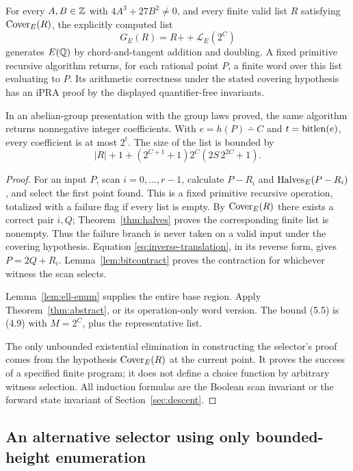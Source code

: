\begin{theorem}
\label{thm:elliptic-cover}
For every $A,B\in\mathbb Z$ with $4A^3+27B^2\ne0$, and every finite valid
list $R$ satisfying $\operatorname{Cover}_E(R)$, the explicitly computed list
\[
                G_E(R)=R\mathbin{+\!\!+}\mathcal L_E(2^C)
 \tag{5.4}\label{eq:genlist}
\]
generates $E(\mathbb Q)$ by chord-and-tangent addition and doubling.
A fixed primitive recursive algorithm returns, for each rational point
$P$, a finite word over this list evaluating to $P$.
Its arithmetic correctness under the stated covering hypothesis has an
iPRA proof by the displayed quantifier-free invariants.

In an abelian-group presentation with the group laws proved, the same
algorithm returns nonnegative integer coefficients. With
$e=h(P)\dotminus C$ and $t=\operatorname{bitlen}(e)$, every coefficient is at most $2^t$.
The size of the list is bounded by
\[
 |R|+1+(2^{C+1}+1)2^C(2S\,2^{2C}+1).
 \tag{5.5}
\]
\end{theorem}
\begin{proof}
For an input $P$, scan $i=0,\ldots,r-1$, calculate $P-R_i$ and
$\operatorname{Halves}_E(P-R_i)$, and select the first point found.
This is a fixed primitive recursive operation, totalized with a failure
flag if every list is empty. By $\operatorname{Cover}_E(R)$ there exists a correct pair
$i,Q$; Theorem~\ref{thm:halves} proves the corresponding finite list is
nonempty. Thus the failure branch is never taken on a valid input under
the covering hypothesis. Equation \eqref{eq:inverse-translation}, in
its reverse form, gives $P=2Q+R_i$.
Lemma~\ref{lem:bitcontract} proves the contraction for whichever witness
the scan selects.

Lemma~\ref{lem:ell-enum} supplies the entire base region.
Apply Theorem~\ref{thm:abstract}, or its operation-only word version.
The bound (5.5) is (4.9) with $M=2^C$, plus the representative list.

The only unbounded existential elimination in constructing the selector's
proof comes from the hypothesis $\operatorname{Cover}_E(R)$ at the current point.
It proves the success of a specified finite program; it does not
define a choice function by arbitrary witness selection. All induction
formulas are the Boolean scan invariant or the forward state invariant of
Section~\ref{sec:descent}.
\end{proof}

\subsection{An alternative selector using only bounded-height enumeration}

